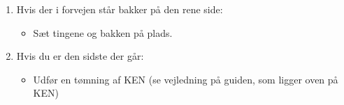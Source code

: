 \documentclass{article}
\begin{document}
\begin{enumerate}
\bfseries \item Hvis der i forvejen står bakker på den rene side: \normalfont

  \begin{itemize}

  \item Sæt tingene og bakken på plads.

  \end{itemize}

\bfseries \item Hvis du er den sidste der går: \normalfont

  \begin{itemize}

    \item Udfør en tømning af KEN (se vejledning på guiden, som ligger oven på
      KEN)

  \end{itemize}

\end{enumerate}

\underskriv
\end{document}

